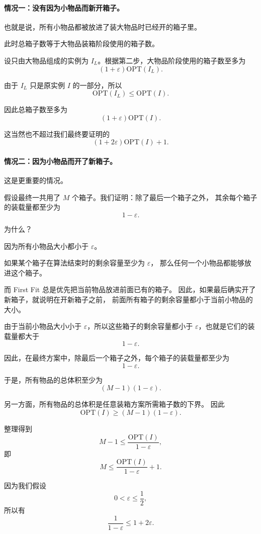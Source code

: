 \documentclass[UTF8,openany,12pt]{ctexbook}
\theoremstyle{remark}
\newcommand{\OPT}{\mathrm{OPT}}
\begin{document}
\paragraph{情况一：没有因为小物品而新开箱子。}

也就是说，所有小物品都被放进了装大物品时已经开的箱子里。

此时总箱子数等于大物品装箱阶段使用的箱子数。

设只由大物品组成的实例为 $I_L$。根据第二步，大物品阶段使用的箱子数至多为
\[
  (1+\varepsilon)\OPT(I_L).
\]

由于 $I_L$ 只是原实例 $I$ 的一部分，所以
\[
  \OPT(I_L)\le \OPT(I).
\]

因此总箱子数至多为
\[
  (1+\varepsilon)\OPT(I).
\]

这当然也不超过我们最终要证明的
\[
  (1+2\varepsilon)\OPT(I)+1.
\]

\paragraph{情况二：因为小物品而开了新箱子。}

这是更重要的情况。

假设最终一共用了 $M$ 个箱子。我们证明：除了最后一个箱子之外，
其余每个箱子的装载量都至少为
\[
  1-\varepsilon.
\]

为什么？

因为所有小物品大小都小于 $\varepsilon$。

如果某个箱子在算法结束时的剩余容量至少为 $\varepsilon$，
那么任何一个小物品都能够放进这个箱子。

而 First Fit 总是优先把当前物品放进前面已有的箱子。
因此，如果最后确实开了新箱子，就说明在开新箱子之前，
前面所有箱子的剩余容量都小于当前小物品的大小。

由于当前小物品大小小于 $\varepsilon$，所以这些箱子的剩余容量都小于
$\varepsilon$，也就是它们的装载量都大于
\[
  1-\varepsilon.
\]

因此，在最终方案中，除最后一个箱子之外，每个箱子的装载量都至少为
\[
  1-\varepsilon.
\]

于是，所有物品的总体积至少为
\[
  (M-1)(1-\varepsilon).
\]

另一方面，所有物品的总体积是任意装箱方案所需箱子数的下界。
因此
\[
  \OPT(I)\ge (M-1)(1-\varepsilon).
\]

整理得到
\[
  M-1\le \frac{\OPT(I)}{1-\varepsilon},
\]
即
\[
  M\le \frac{\OPT(I)}{1-\varepsilon}+1.
\]

因为我们假设
\[
  0<\varepsilon\le \frac12,
\]
所以有
\[
  \frac{1}{1-\varepsilon}\le 1+2\varepsilon.
\]
\end{document}
